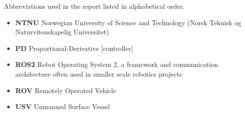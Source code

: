 \documentclass[class=article, crop=false]{standalone}
\begin{document}
Abbreviations used in the report listed in alphabetical order.
\begin{itemize}
    \item \textbf{NTNU} Norwegian University of Science and Technology (Norsk Teknisk og Naturvitenskapelig Universitet)   
    \item \textbf{PD} Proportional-Derivative [controller]
    \item \textbf{ROS2} Robot Operating System 2, a framework and communication architecture often used in smaller scale robotics projects
    \item \textbf{ROV} Remotely Operated Vehicle
    \item \textbf{USV} Unmanned Surface Vessel
\end{itemize}
\end{document}
